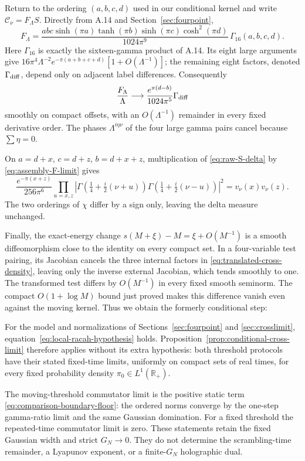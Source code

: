 Return to the ordering $(a,b,c,d)$ used in our conditional kernel and
write $\mathcal C_\nu=F_\Lambda S$. Directly from A.14 and
Section~\ref{sec:fourpoint},
\begin{equation}
 F_\Lambda=
 \frac{abc\sinh(\pi a)\tanh(\pi b)\sinh(\pi c)\cosh^2(\pi d)}
 {1024\pi^9}\,\Gamma_{16}(a,b,c,d).
 \label{eq:assembly-external-F}
\end{equation}
Here $\Gamma_{16}$ is exactly the sixteen-gamma product of A.14.
Its eight large arguments give
$16\pi^4\Lambda^{-2}e^{-\pi(a+b+c+d)}[1+O(\Lambda^{-1})]$;
the remaining eight factors, denoted $\Gamma_{\rm diff}$, depend only
on adjacent label differences. Consequently
\begin{equation}
 \frac{F_\Lambda}{\Lambda}
 \longrightarrow\frac{e^{\pi(d-b)}}{1024\pi^5}\Gamma_{\rm diff}
 \label{eq:assembly-F-limit}
\end{equation}
smoothly on compact offsets, with an $O(\Lambda^{-1})$ remainder in
every fixed derivative order. The phases $\Lambda^{i\eta\nu}$ of the
four large gamma pairs cancel because $\sum\eta=0$.

On $a=d+x$, $c=d+z$, $b=d+x+z$, multiplication of
\eqref{eq:raw-S-delta} by \eqref{eq:assembly-F-limit} gives
\begin{equation}
 \frac{e^{-\pi(x+z)}}{256\pi^6}
 \prod_{u=x,z}\left|
 \Gamma\left(\tfrac14+\tfrac i2(\nu+u)\right)
 \Gamma\left(\tfrac14+\tfrac i2(\nu-u)\right)\right|^2
 =v_\nu(x)v_\nu(z).
 \label{eq:assembly-delta-weight}
\end{equation}
The two orderings of $\chi$ differ by a sign only, leaving the delta
measure unchanged.

Finally, the exact-energy change $s(M+\xi)-M=\xi+O(M^{-1})$ is a
smooth diffeomorphism close to the identity on every compact set.
In a four-variable test pairing, its Jacobian cancels the three internal
factors in \eqref{eq:translated-cross-density}, leaving only the inverse
external Jacobian, which tends smoothly to one. The transformed test
differs by $O(M^{-1})$ in every fixed smooth seminorm. The compact
$O(1+\log M)$ bound just proved makes this difference vanish even
against the moving kernel. Thus we obtain the formerly conditional step:
\begin{theorem}
For the model and normalizations of Sections~\ref{sec:fourpoint} and
\ref{sec:crosslimit}, equation~\eqref{eq:local-racah-hypothesis} holds.
Proposition~\ref{prop:conditional-cross-limit} therefore applies without
its extra hypothesis: both threshold protocols have their stated
fixed-time limits, uniformly on compact sets of real times, for every
fixed probability density $\pi_0\in L^1(\mathbb R_+)$.
\label{thm:fixed-time-crossed}
\end{theorem}
The moving-threshold commutator limit is the positive static term
\eqref{eq:comparison-boundary-floor}: the ordered norms converge by
the one-step gamma-ratio limit and the same Gaussian domination.
For a fixed threshold the repeated-time commutator limit is zero.
These statements retain the fixed Gaussian width and strict $G_N\to0$.
They do not determine the scrambling-time remainder, a Lyapunov exponent,
or a finite-$G_N$ holographic dual.
